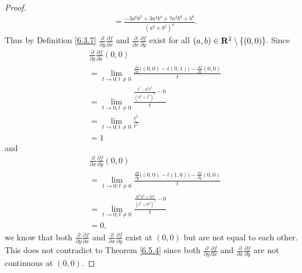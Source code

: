 \begin{proof}
\begin{align*}
         & = \frac{-3 a^6 b^2 + 3 a^4 b^4 + 7 a^2 b^6 + b^8}{(a^2 + b^2)^4}.
    \end{align*}
    Thus by Definition \ref{6.3.7} \(\frac{\partial}{\partial y} \frac{\partial f}{\partial x}\) and \(\frac{\partial}{\partial x} \frac{\partial f}{\partial y}\) exist for all \((a, b) \in \mathbf{R}^2 \setminus \{(0, 0)\}\).
    Since
    \begin{align*}
         & \frac{\partial}{\partial y} \frac{\partial f}{\partial x}(0, 0)                                                                     \\
         & = \lim_{t \to 0 ; t \neq 0} \frac{\frac{\partial f}{\partial x}\big((0, 0) - t(0, 1)\big) - \frac{\partial f}{\partial x}(0, 0)}{t} \\
         & = \lim_{t \to 0 ; t \neq 0} \frac{\frac{t^5 - 0^2 t^3}{(0^2 + t^2)^2} - 0}{t}                                                       \\
         & = \lim_{t \to 0 ; t \neq 0} \frac{t^5}{t^5}                                                                                         \\
         & = 1
    \end{align*}
    and
    \begin{align*}
         & \frac{\partial}{\partial x} \frac{\partial f}{\partial y}(0, 0)                                                                     \\
         & = \lim_{t \to 0 ; t \neq 0} \frac{\frac{\partial f}{\partial y}\big((0, 0) - t(1, 0)\big) - \frac{\partial f}{\partial y}(0, 0)}{t} \\
         & = \lim_{t \to 0 ; t \neq 0} \frac{\frac{3 t^3 0^2 + t 0^4}{(t^2 + 0^2)^2} - 0}{t}                                                   \\
         & = 0,
    \end{align*}
    we know that both \(\frac{\partial}{\partial y} \frac{\partial f}{\partial x}\) and \(\frac{\partial}{\partial x} \frac{\partial f}{\partial y}\) exist at \((0, 0)\) but are not equal to each other.
    This does not contradict to Theorem \ref{6.5.4} since both \(\frac{\partial}{\partial y} \frac{\partial f}{\partial x}\) and \(\frac{\partial}{\partial x} \frac{\partial f}{\partial y}\) are not continuous at \((0, 0)\).
\end{proof}